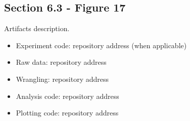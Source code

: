 \subsection{Section 6.3 - Figure 17}
\label{apndx:fig17}

Artifacts description.

\begin{itemize}
    \item Experiment code: repository address (when applicable)
    \item Raw data: repository address
    \item Wrangling: repository address
    \item Analysis code: repository address
    \item Plotting code: repository address
\end{itemize}
